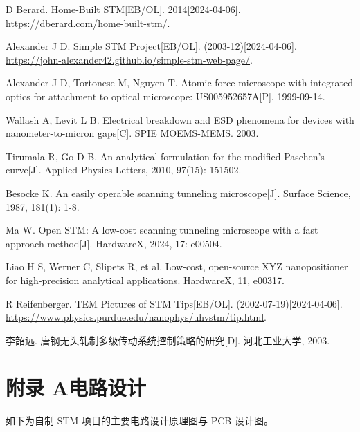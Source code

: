 \documentclass[zihao=-4]{ctexart}
\begin{document}
\begin{thebibliography}{25}
	 D Berard. Home-Built STM[EB/OL]. 2014[2024-04-06]. \href{https://dberard.com/home-built-stm/}{https://dberard.com/home-built-stm/}.
	
	 Alexander J D. Simple STM Project[EB/OL]. (2003-12)[2024-04-06]. \href{https://john-alexander42.github.io/simple-stm-web-page/}{https://john-alexander42.github.io/simple-stm-web-page/}.
	
	 Alexander J D, Tortonese M, Nguyen T. Atomic force microscope with integrated optics for attachment to optical microscope: US005952657A[P]. 1999-09-14.
	
	 Wallash A, Levit L B. Electrical breakdown and ESD phenomena for devices with nanometer-to-micron gaps[C]. SPIE MOEMS-MEMS. 2003. 
	
	 Tirumala R, Go D B. An analytical formulation for the modified Paschen’s curve[J]. Applied Physics Letters, 2010, 97(15): 151502.
	
	 Besocke K. An easily operable scanning tunneling microscope[J]. Surface Science, 1987, 181(1): 1-8.
	
	 Ma W. Open STM: A low-cost scanning tunneling microscope with a fast approach method[J]. HardwareX, 2024, 17: e00504.
	
	 Liao H S, Werner C, Slipets R, et al. Low-cost, open-source XYZ nanopositioner for high-precision analytical applications. HardwareX, 11, e00317.
	
	 R Reifenberger. TEM Pictures of STM Tips[EB/OL]. (2002-07-19)[2024-04-06]. \href{https://www.physics.purdue.edu/nanophys/uhvstm/tip.html}{https://www.physics.purdue.edu/nanophys/uhvstm/tip.html}.
	
	 李韶远. 唐钢无头轧制多级传动系统控制策略的研究[D]. 河北工业大学, 2003.
	
	
\end{thebibliography}
\endgroup

\newpage
\appendix
\section*{附录 A\quad 电路设计}
{} %
\label{app:A}

如下为自制 STM 项目的主要电路设计原理图与 PCB 设计图。
\end{document}
